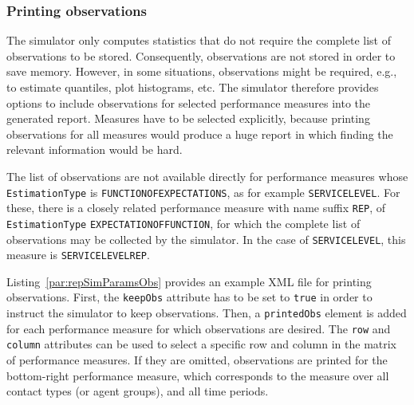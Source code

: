 

\subsubsection{Printing observations}

The simulator only computes statistics that do
not require the complete list of observations to be stored.
Consequently, observations are not stored in order to save memory.
However, in some situations, observations might be required, e.g.,
to estimate quantiles, plot histograms, etc.
The simulator therefore provides options to include observations for
selected performance measures into the generated report.
Measures have to be selected explicitly, because printing observations
for all measures would produce a huge report in which finding
the relevant information would be hard.

The list of observations are not available directly for performance measures
whose \texttt{EstimationType} is \texttt{FUNCTIONOFEXPECTATIONS}, as
for example \texttt{SERVICELEVEL}. For these, there is a closely related
performance measure with name suffix \texttt{REP},  of \texttt{EstimationType}
\texttt{EXPECTATIONOFFUNCTION}, for which the
complete list of observations may be collected by the simulator.
In the case of \texttt{SERVICELEVEL}, this measure is
\texttt{SERVICELEVELREP}.

Listing~\ref{par:repSimParamsObs} provides an example XML file for
printing observations.
First, the \texttt{keepObs} attribute has to be set to \texttt{true}
in order to instruct the simulator to keep observations.
Then, a \texttt{printedObs} element is added
for each performance measure for which observations are
desired.
The \texttt{row} and \texttt{column} attributes can be used to select
a specific row and column in the matrix of performance measures.
If they are omitted, observations are printed for the bottom-right
performance measure, which corresponds to the measure over all contact
types (or agent groups), and all time periods.



